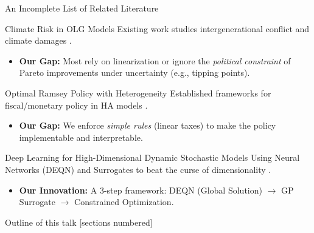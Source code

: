 \documentclass[aspectratio=1610]{beamer}
\begin{document}
\begin{frame}{An Incomplete List of Related Literature}
    \small
    
    \begin{block}{Climate Risk in OLG Models}
        Existing work studies intergenerational conflict and climate damages \citep{kotlikoff2021making, weitzman2012ghg, Karp2014}.
        \begin{itemize}
            \item[\textcolor{blue}{\textbf{+}}] \textbf{Our Gap:} Most rely on linearization or ignore the \textit{political constraint} of Pareto improvements under uncertainty (e.g., tipping points).
        \end{itemize}
    \end{block}

    \begin{block}{Optimal Ramsey Policy with Heterogeneity}
        Established frameworks for fiscal/monetary policy in HA models \citep{bhandari2013taxes, nuno2020Optimal, douenne_hummel_pedroni_2024}.
        \begin{itemize}
             \item[\textcolor{blue}{\textbf{+}}] \textbf{Our Gap:} We enforce \textit{simple rules} (linear taxes) to make the policy implementable and interpretable.
        \end{itemize}
    \end{block}

    \begin{block}{Deep Learning for High-Dimensional Dynamic Stochastic Models}
        Using Neural Networks (DEQN) and Surrogates to beat the curse of dimensionality \citep{azinovic_et_al_2019, friedlDeep2023}.
        \begin{itemize}
             \item[\textcolor{blue}{\textbf{+}}] \textbf{Our Innovation:} A 3-step framework: DEQN (Global Solution) $\to$ GP Surrogate $\to$ Constrained Optimization.
        \end{itemize}
    \end{block}
\end{frame}

\begin{frame}{Outline of this talk}
  [sections numbered]
  \tableofcontents%
\end{frame}
\end{document}
